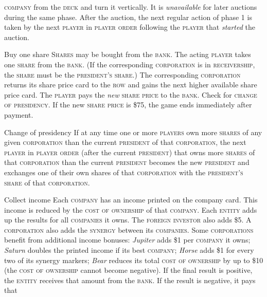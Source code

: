 \documentclass[11pt,a4paper]{article}
\newenvironment{my_description}
  {\begin{list}{}{\setlength{\labelwidth}{0pt}
   \leftmargin=1.2em
   \setlength{\itemindent}{-\leftmargin}
   \renewcommand{\makelabel}{\descriptionlabel}}
  \setlength{\itemsep}{1pt}
  \setlength{\parskip}{0pt}
  \setlength{\parsep}{0pt}
  }
  {\end{list}}
\begin{document}
\begin{multicols}{2}
{\begin{my_description}
  \textsc{company} from the \textsc{deck} and turn it vertically. It
  is \emph{unavailable} for later auctions during the same
  phase. After the auction, the next regular action of phase 1 is
  taken by the next \textsc{player} in \textsc{player order} following
  the \textsc{player} that \emph{started} the auction.
\item[Buy one share] \textsc{Shares} may be bought from the
  \textsc{bank}. The acting \textsc{player} takes one \textsc{share}
  from the \textsc{bank}. (If the corresponding \textsc{corporation} is
  in \textsc{receivership}, the \textsc{share} must be the
  \textsc{president's} \textsc{share}.) The corresponding
  \textsc{corporation} returns its share price card to the
  \textsc{row} and gains the next higher available share price
  card. The \textsc{player} pays the \emph{new} \textsc{share price}
  to the \textsc{bank}. Check for \textsc{change of presidency}. If
  the new \textsc{share price} is \$75, the game ends immediately
  after payment.
\item[Change of presidency] If at any time one or more
  \textsc{players} own more \textsc{shares} of any given
  \textsc{corporation} than the current \textsc{president} of that
  \textsc{corporation}, the next \textsc{player} in \textsc{player
    order} (after the current \textsc{president}) that owns more
  \textsc{shares} of that \textsc{corporation} than the current
  \textsc{president} becomes the new \textsc{president} and exchanges
  one of their own shares of that \textsc{corporation} with the
  \textsc{president's} \textsc{share} of that \textsc{corporation}.
\item[Collect income] Each \textsc{company} has an income printed on
  the company card. This income is reduced by the \textsc{cost of
    ownership} of that \textsc{company}. Each \textsc{entity} adds up
  the results for all \textsc{companies} it owns. The \textsc{foreign
    investor} also adds \$5. A \textsc{corporation} also adds the
  \textsc{synergy} between its \textsc{companies}. Some
  \textsc{corporations} benefit from additional income bonuses:
  \emph{Jupiter} adds \$1 per \textsc{company} it owns; \emph{Saturn}
  doubles the printed income if its best \textsc{company};
  \emph{Horse} adds \$1 for every two of its synergy markers;
  \emph{Bear} reduces its total \textsc{cost of ownership} by up to
  \$10 (the \textsc{cost of ownership} cannot become negative). If the
  final result is positive, the \textsc{entity} receives that amount
  from the \textsc{bank}. If the result is negative, it pays that

\end{my_description}}
\end{multicols}
\end{document}
